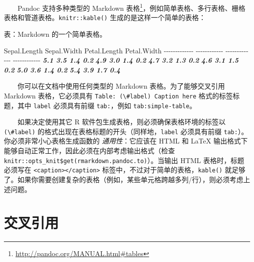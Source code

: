 \documentclass[
  12pt,
]{krantz}
\newenvironment{Shaded}{\begin{snugshade}}{\end{snugshade}}
\newcommand{\InformationTok}[1]{\textcolor[rgb]{0.56,0.35,0.01}{\textbf{\textit{#1}}}}
\newcommand{\NormalTok}[1]{#1}
\renewcommand{\href}[2]{#2\footnote{\url{#1}}}
\theoremstyle{definition}
\theoremstyle{definition}
\theoremstyle{definition}
\theoremstyle{definition}
\theoremstyle{remark}
\begin{document}
  Pandoc 支持多种类型的 \href{http://pandoc.org/MANUAL.html\#tables}{Markdown 表格}，例如简单表格、多行表格、栅格表格和管道表格。\texttt{knitr::kable()} 生成的是这样一个简单的表格：

\begin{Shaded}
\begin{Highlighting}[]
\NormalTok{表：Markdown 的一个简单表格。}

\NormalTok{ Sepal.Length   Sepal.Width   Petal.Length   Petal.Width}
\NormalTok{{-}{-}{-}{-}{-}{-}{-}{-}{-}{-}{-}{-}{-}  {-}{-}{-}{-}{-}{-}{-}{-}{-}{-}{-}{-}  {-}{-}{-}{-}{-}{-}{-}{-}{-}{-}{-}{-}{-}  {-}{-}{-}{-}{-}{-}{-}{-}{-}{-}{-}{-}}
\InformationTok{          5.1           3.5            1.4           0.2}
\InformationTok{          4.9           3.0            1.4           0.2}
\InformationTok{          4.7           3.2            1.3           0.2}
\InformationTok{          4.6           3.1            1.5           0.2}
\InformationTok{          5.0           3.6            1.4           0.2}
\InformationTok{          5.4           3.9            1.7           0.4}
\end{Highlighting}
\end{Shaded}

  你可以在文档中使用任何类型的 Markdown 表格。为了能够交叉引用 Markdown 表格，它必须具有 \texttt{Table:\ (\textbackslash{}\#label)\ Caption\ here} 格式的标签标题，其中 \texttt{label} 必须具有前缀 \texttt{tab:}，例如 \texttt{tab:simple-table}。

  如果决定使用其它 R 软件包生成表格，则必须确保表格环境的标签以 \texttt{(\textbackslash{}\#label)} 的格式出现在表格标题的开头（同样地，\texttt{label} 必须具有前缀 \texttt{tab:}）。你必须非常小心表格生成函数的 \emph{通用性}：它应该在 HTML 和 LaTeX 输出格式下能够自动正常工作，因此必须在内部考虑输出格式（检查 \texttt{knitr::opts\_knit\$get(\textquotesingle{}rmarkdown.pandoc.to\textquotesingle{})}）。当输出 HTML 表格时，标题必须写在 \texttt{\textless{}caption\textgreater{}\textless{}/caption\textgreater{}} 标签中，不过对于简单的表格，\texttt{kable()} 就足够了。如果你需要创建复杂的表格（例如，某些单元格跨越多列/行），则必须考虑上述问题。

\hypertarget{cross-references}{%
\section{交叉引用}\label{cross-references}}
\end{document}
